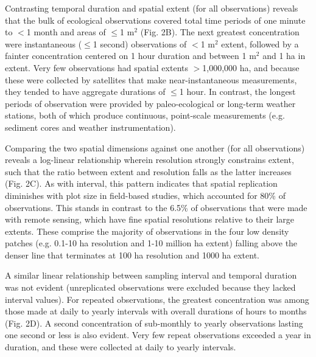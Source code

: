\documentclass[12pt]{article}
\begin{document}
Contrasting temporal duration and spatial extent (for all observations) reveals that the bulk of ecological observations covered total time periods of one minute to $<$1 month and areas of $\leq$1 m$^2$ (Fig. 2B). The next greatest concentration were instantaneous ($\leq$1 second) observations of $<$1 m$^2$ extent, followed by a fainter concentration centered on 1 hour duration and between 1 m$^2$ and 1 ha in extent. Very few observations had spatial extents $>$1,000,000 ha, and because these were collected by satellites that make near-instantaneous measurements, they tended to have aggregate durations of $\leq$1 hour. In contrast, the longest periods of observation were provided by paleo-ecological or long-term weather stations, both of which produce continuous, point-scale measurements (e.g. sediment cores and weather instrumentation). 

Comparing the two spatial dimensions against one another (for all observations) reveals a log-linear relationship wherein resolution strongly constrains extent, such that the ratio between extent and resolution falls as the latter increases (Fig. 2C). As with interval, this pattern indicates that spatial replication diminishes with plot size \cite{kareiva_spatial_1988} in field-based studies, which accounted for 80\% of observations. This stands in contrast to the 6.5\% of observations that were made with remote sensing, which have fine spatial resolutions relative to their large extents. These comprise the majority of observations in the four low density patches (e.g. 0.1-10 ha resolution and 1-10 million ha extent) falling above the denser line that terminates at 100 ha resolution and 1000 ha extent.  

A similar linear relationship between sampling interval and temporal duration was not evident (unreplicated observations were excluded because they lacked interval values). For repeated observations, the greatest concentration was among those made at daily to yearly intervals with overall durations of hours to months (Fig. 2D). A second concentration of sub-monthly to yearly observations lasting one second or less is also evident. Very few repeat observations exceeded a year in duration, and these were collected at daily to yearly intervals. 
\end{document}
